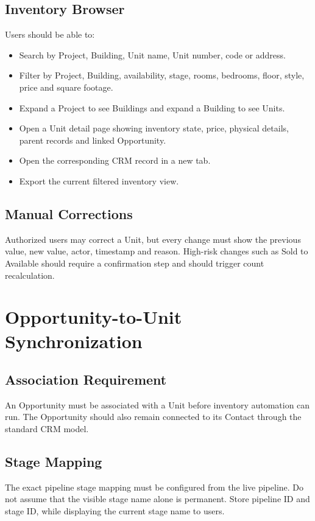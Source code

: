 \documentclass[10pt]{article}
\begin{document}
\subsection{Inventory Browser}
Users should be able to:
\begin{itemize}
\item Search by Project, Building, Unit name, Unit number, code or address.
\item Filter by Project, Building, availability, stage, rooms, bedrooms, floor, style, price and square footage.
\item Expand a Project to see Buildings and expand a Building to see Units.
\item Open a Unit detail page showing inventory state, price, physical details, parent records and linked Opportunity.
\item Open the corresponding CRM record in a new tab.
\item Export the current filtered inventory view.
\end{itemize}

\subsection{Manual Corrections}
Authorized users may correct a Unit, but every change must show the previous value, new value, actor, timestamp and reason. High-risk changes such as Sold to Available should require a confirmation step and should trigger count recalculation.

\section{Opportunity-to-Unit Synchronization}
\subsection{Association Requirement}
An Opportunity must be associated with a Unit before inventory automation can run. The Opportunity should also remain connected to its Contact through the standard CRM model.

\subsection{Stage Mapping}
The exact pipeline stage mapping must be configured from the live pipeline. Do not assume that the visible stage name alone is permanent. Store pipeline ID and stage ID, while displaying the current stage name to users.
\end{document}
